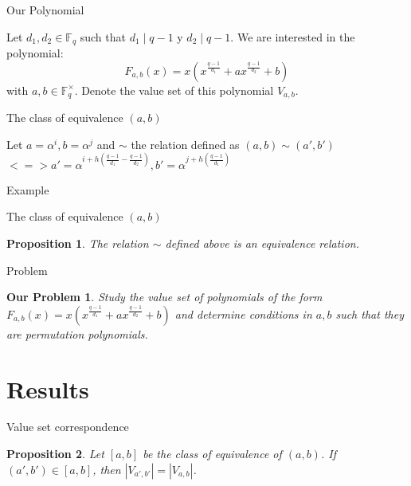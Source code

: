 \documentclass{beamer}
\newtheorem{proposition}{Proposition}
\newtheorem{ourproblem}{Our Problem}
\begin{document}
\begin{frame}{Our Polynomial}
  

  Let $d_1, d_2 \in \mathbb{F}_q$ such that $d_1 \mid q-1$ y $d_2 \mid q-1$. We are interested in the polynomial:
  {\Large$$F_{a,b}(x) = x(x^{\frac{q-1}{d_1}} + ax^{\frac{q-1}{d_2}} +b)$$ }
  with $a,b \in \mathbb{F}_q^{\times}$. 
  \pause 
  \linebreak
  Denote the value set of this polynomial $V_{a,b}$.

\end{frame}

\begin{frame}{The class of equivalence $(a,b)$}
  
  Let $a = \alpha^i, b = \alpha^j$ and $\sim$ the relation defined as $(a,b) \sim (a', b')$ 
  $<=> a' = \alpha^{i+h(\frac{q-1}{d_1} - \frac{q-1}{d_2})}, b' = \alpha^{j+h(\frac{q-1}{d_1})}$

  \alert{Example}

\end{frame}

\begin{frame}{The class of equivalence $(a,b)$}
  
  \begin{proposition}
    The relation $\sim$ defined above is an equivalence relation.
  \end{proposition}

\end{frame}

\begin{frame}{Problem}
  \begin{ourproblem}
    Study the value set of polynomials of the form $F_{a,b}(x) = x(x^{\frac{q-1}{d_1}} + ax^{\frac{q-1}{d_2}} +b)$ and determine conditions in $a,b$ such that they are permutation polynomials.
  \end{ourproblem}
\end{frame}

\section{Results} %
\label{sec:results}

\begin{frame}{Value set correspondence}
  \begin{proposition}

    Let $[a, b]$ be the class of equivalence of $(a, b)$. If $(a', b') \in [a, b]$,
     then $|V_{a', b'}| = |V_{a, b}|$.

  \end{proposition}
\end{frame}
\end{document}
